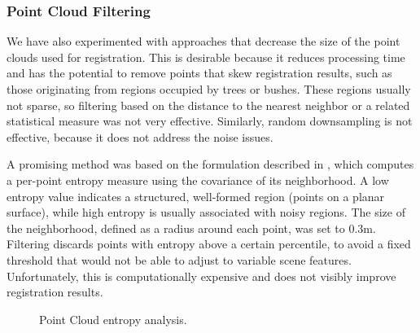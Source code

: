 \subsubsection{Point Cloud Filtering}

We have also experimented with approaches that decrease the size of the point clouds used for registration. This is desirable because it reduces processing time and has the potential to remove points that skew registration results, such as those originating from regions occupied by trees or bushes. These regions usually not sparse, so filtering based on the distance to the nearest neighbor or a related statistical measure was not very effective.
Similarly, random downsampling is not effective, because it does not address the noise issues.

A promising method was based on the formulation described in \cite{adolfsson2021coral}, which computes a per-point entropy measure using the covariance of its neighborhood.
A low entropy value indicates a structured, well-formed region (\eg points on a planar surface), while high entropy is usually associated with noisy regions. 
The size of the neighborhood, defined as a radius around each point, was set to 0.3m.
Filtering discards points with entropy above a certain percentile, to avoid a fixed threshold that would not be able to adjust to variable scene features.  Unfortunately, this is computationally expensive and does not visibly improve registration results.

\begin{figure}
	\centering
	\hfill
	\caption[Filtering using entropy]{Point Cloud entropy analysis.}
	\label{fig:entropy-analysis}
\end{figure}

